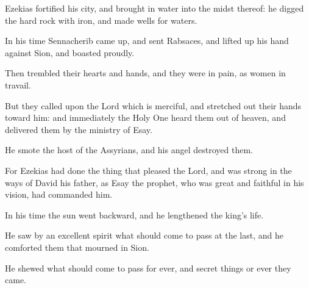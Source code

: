 {\par }{\PP {}Ezekias fortified his city, and brought in water into the midst thereof: he digged the hard rock with iron, and made wells for waters.
\par }{\PP {}In his time Sennacherib came up, and sent Rabsaces, and lifted up his hand against Sion, and boasted proudly.
\par }{\PP {}Then trembled their hearts and hands, and they were in pain, as women in travail.
\par }{\PP {}But they called upon the Lord which is merciful, and stretched out their hands toward him: and immediately the Holy One heard them out of heaven, and delivered them by the ministry of Esay.
\par }{\PP {}He smote the host of the Assyrians, and his angel destroyed them.
\par }{\PP {}For Ezekias had done the thing that pleased the Lord, and was strong in the ways of David his father, as Esay the prophet, who was great and faithful in his vision, had commanded him.
\par }{\PP {}In his time the sun went backward, and he lengthened the king’s life.
\par }{\PP {}He saw by an excellent spirit what should come to pass at the last, and he comforted them that mourned in Sion.
\par }{\PP {}He shewed what should come to pass for ever, and secret things or ever they came.

}
